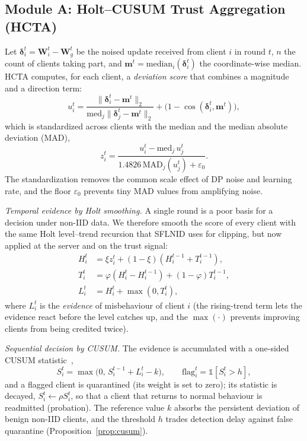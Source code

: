 \documentclass[journal]{IEEEtran}
\begin{document}
\subsection{Module A: Holt--CUSUM Trust Aggregation (HCTA)}
Let $\boldsymbol{\delta}_i^t=\mathbf{W}_i^t-\mathbf{W}_g^t$ be the noised update received from client $i$ in round $t$, $n$ the count of clients taking part, and $\mathbf{m}^t=\mathrm{median}_i(\boldsymbol{\delta}_i^t)$ the coordinate-wise median. HCTA computes, for each client, a \emph{deviation score} that combines a magnitude and a direction term:
\begin{equation}
u_i^t=\frac{\|\boldsymbol{\delta}_i^t-\mathbf{m}^t\|_2}{\mathrm{med}_j\|\boldsymbol{\delta}_j^t-\mathbf{m}^t\|_2}+\Big(1-\cos(\boldsymbol{\delta}_i^t,\mathbf{m}^t)\Big),
\end{equation}
which is standardized across clients with the median and the median absolute deviation (MAD),
\begin{equation}
z_i^t=\frac{u_i^t-\mathrm{med}_j\,u_j^t}{1.4826\,\mathrm{MAD}_j(u_j^t)+\varepsilon_0}.
\end{equation}
The standardization removes the common scale effect of DP noise and learning rate, and the floor $\varepsilon_0$ prevents tiny MAD values from amplifying noise.

\emph{Temporal evidence by Holt smoothing.} A single round is a poor basis for a decision under non-IID data. We therefore smooth the score of every client with the same Holt level--trend recursion that SFLNID uses for clipping, but now applied at the server and on the trust signal:
\begin{align}
H_i^t&=\xi z_i^t+(1-\xi)(H_i^{t-1}+T_i^{t-1}),\\
T_i^t&=\varphi(H_i^t-H_i^{t-1})+(1-\varphi)T_i^{t-1},\\
L_i^t&=H_i^t+\max(0,T_i^t),
\end{align}
where $L_i^t$ is the \emph{evidence} of misbehaviour of client $i$ (the rising-trend term lets the evidence react before the level catches up, and the $\max(\cdot)$ prevents improving clients from being credited twice).

\emph{Sequential decision by CUSUM.} The evidence is accumulated with a one-sided CUSUM statistic~\cite{page},
\begin{equation}
S_i^t=\max\big(0,\,S_i^{t-1}+L_i^t-k\big),\qquad \text{flag}_i^t=\mathbb{1}[S_i^t>h],
\end{equation}
and a flagged client is quarantined (its weight is set to zero); its statistic is decayed, $S_i^t\leftarrow\rho S_i^t$, so that a client that returns to normal behaviour is readmitted (probation). The reference value $k$ absorbs the persistent deviation of benign non-IID clients, and the threshold $h$ trades detection delay against false quarantine (Proposition~\ref{prop:cusum}).
\end{document}
